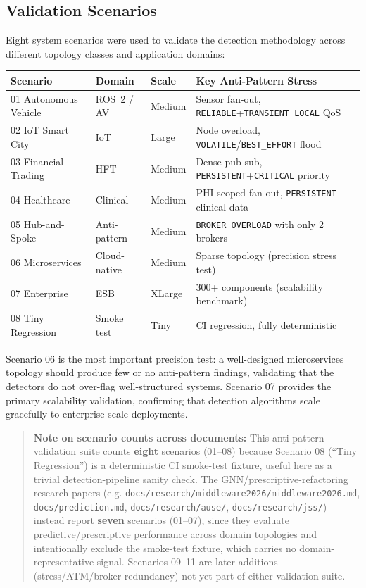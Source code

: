 \documentclass[11pt]{article}
\begin{document}
\subsection{Validation Scenarios}

Eight system scenarios were used to validate the detection methodology across different topology classes and application domains:

\begin{center}
\begin{tabular}{@{}llll@{}}
\toprule
\textbf{Scenario} & \textbf{Domain} & \textbf{Scale} & \textbf{Key Anti-Pattern Stress} \\
\midrule
01 Autonomous Vehicle & ROS~2 / AV & Medium & Sensor fan-out, \texttt{RELIABLE}+\texttt{TRANSIENT\_LOCAL} QoS \\
02 IoT Smart City & IoT & Large & Node overload, \texttt{VOLATILE}/\texttt{BEST\_EFFORT} flood \\
03 Financial Trading & HFT & Medium & Dense pub-sub, \texttt{PERSISTENT}+\texttt{CRITICAL} priority \\
04 Healthcare & Clinical & Medium & PHI-scoped fan-out, \texttt{PERSISTENT} clinical data \\
05 Hub-and-Spoke & Anti-pattern & Medium & \texttt{BROKER\_OVERLOAD} with only 2 brokers \\
06 Microservices & Cloud-native & Medium & Sparse topology (precision stress test) \\
07 Enterprise & ESB & XLarge & 300+ components (scalability benchmark) \\
08 Tiny Regression & Smoke test & Tiny & CI regression, fully deterministic \\
\bottomrule
\end{tabular}
\end{center}

Scenario 06 is the most important precision test: a well-designed microservices topology should produce few or no anti-pattern findings, validating that the detectors do not over-flag well-structured systems. Scenario 07 provides the primary scalability validation, confirming that detection algorithms scale gracefully to enterprise-scale deployments.

\begin{quote}
\textbf{Note on scenario counts across documents:} This anti-pattern validation suite counts \textbf{eight} scenarios (01--08) because Scenario 08 (``Tiny Regression'') is a deterministic CI smoke-test fixture, useful here as a trivial detection-pipeline sanity check. The GNN/prescriptive-refactoring research papers (e.g. \texttt{docs/research/middleware2026/middleware2026.md}, \texttt{docs/prediction.md}, \texttt{docs/research/ause/}, \texttt{docs/research/jss/}) instead report \textbf{seven} scenarios (01--07), since they evaluate predictive/prescriptive performance across domain topologies and intentionally exclude the smoke-test fixture, which carries no domain-representative signal. Scenarios 09--11 are later additions (stress/ATM/broker-redundancy) not yet part of either validation suite.
\end{quote}
\end{document}
